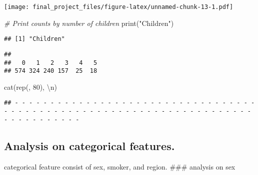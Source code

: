 \documentclass[
]{article}
\newenvironment{Shaded}{\begin{snugshade}}{\end{snugshade}}
\newcommand{\CommentTok}[1]{\textcolor[rgb]{0.56,0.35,0.01}{\textit{#1}}}
\newcommand{\DecValTok}[1]{\textcolor[rgb]{0.00,0.00,0.81}{#1}}
\newcommand{\FunctionTok}[1]{\textcolor[rgb]{0.00,0.00,0.00}{#1}}
\newcommand{\NormalTok}[1]{#1}
\newcommand{\OtherTok}[1]{\textcolor[rgb]{0.56,0.35,0.01}{#1}}
\newcommand{\SpecialCharTok}[1]{\textcolor[rgb]{0.00,0.00,0.00}{#1}}
\newcommand{\StringTok}[1]{\textcolor[rgb]{0.31,0.60,0.02}{#1}}
\begin{document}
\texttt{[image: final\_project\_files/figure-latex/unnamed-chunk-13-1.pdf]}

\begin{Shaded}
\begin{Highlighting}[]
\CommentTok{\# Print counts by number of children}
\FunctionTok{print}\NormalTok{(}\StringTok{"Children"}\NormalTok{)}
\end{Highlighting}
\end{Shaded}

\begin{verbatim}
## [1] "Children"
\end{verbatim}

\begin{Shaded}
\end{Shaded}

\begin{verbatim}
## 
##   0   1   2   3   4   5 
## 574 324 240 157  25  18
\end{verbatim}

\begin{Shaded}
\begin{Highlighting}[]
\FunctionTok{cat}\NormalTok{(}\FunctionTok{rep}\NormalTok{(}\StringTok{\textquotesingle{}{-}\textquotesingle{}}\NormalTok{, }\DecValTok{80}\NormalTok{), }\StringTok{\textquotesingle{}}\SpecialCharTok{\textbackslash{}n}\StringTok{\textquotesingle{}}\NormalTok{)}
\end{Highlighting}
\end{Shaded}

\begin{verbatim}
## - - - - - - - - - - - - - - - - - - - - - - - - - - - - - - - - - - - - - - - - - - - - - - - - - - - - - - - - - - - - - - - - - - - - - - - - - - - - - - - -
\end{verbatim}

\hypertarget{analysis-on-categorical-features.}{%
\subsection{Analysis on categorical
features.}\label{analysis-on-categorical-features.}}

categorical feature consist of sex, smoker, and region. \#\#\# analysis
on sex
\end{document}
